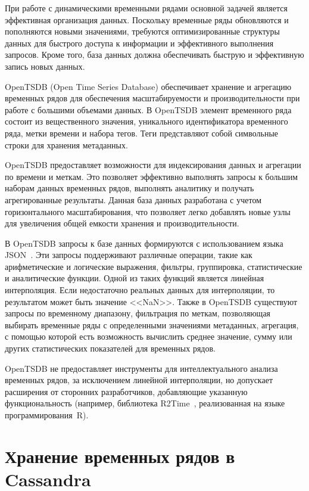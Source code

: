 При работе с динамическими временными рядами основной задачей является эффективная организация данных.
Поскольку временные ряды обновляются и пополняются новыми значениями, требуются оптимизированные структуры данных для быстрого доступа к информации и эффективного выполнения запросов.
Кроме того, база данных должна обеспечивать быструю и эффективную запись новых данных.

OpenTSDB (Open Time Series Database) обеспечивает хранение и агрегацию временных рядов для обеспечения масштабируемости и производительности при работе с большими объемами данных.
В OpenTSDB элемент временного ряда состоит из вещественного значения, уникального идентификатора временного ряда, метки времени и набора тегов.
Теги представляют собой символьные строки для хранения метаданных.

OpenTSDB предоставляет возможности для индексирования данных и агрегации по времени и меткам.
Это позволяет эффективно выполнять запросы к большим наборам данных временных рядов, выполнять аналитику и получать агрегированные результаты.
Данная база данных разработана с учетом горизонтального масштабирования, что позволяет легко добавлять новые узлы для увеличения общей емкости хранения и производительности.

В OpenTSDB запросы к базе данных формируются с использованием языка JSON~\cite{aliref10}.
Эти запросы поддерживают различные операции, такие как арифметические и логические выражения, фильтры, группировка, статистические и аналитические функции.
Одной из таких функций является линейная интерполяция.
Если недостаточно реальных данных для интерполяции, то результатом может быть значение <<NaN>>.
Также в OpenTSDB существуют запросы по временному диапазону, фильтрация по меткам, позволяющая выбирать временные ряды с определенными значениями метаданных, агрегация, с помощью которой есть возможность вычислить среднее значение, сумму или других статистических показателей для временных рядов.

OpenTSDB не предоставляет инструменты для интеллектуального анализа временных рядов, за исключением линейной интерполяции, но допускает расширения от сторонних разработчиков, добавляющие указанную функциональность (например, библиотека R2Time~\cite{aliref11}, реализованная на языке программирования~R).

\section{Хранение временных рядов в Cassandra}


